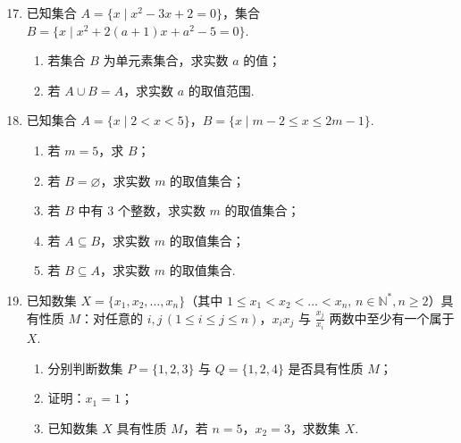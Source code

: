 \documentclass[a4paper,11pt]{article}
\begin{document}
\begin{enumerate}
\setcounter{enumi}{16}

\item 已知集合 $A=\{x\mid x^2-3x+2=0\}$，集合 $B=\{x\mid x^2+2(a+1)x+a^2-5=0\}$.
\begin{enumerate}[label=(\arabic*)]
\item 若集合 $B$ 为单元素集合，求实数 $a$ 的值；
\item 若 $A\cup B=A$，求实数 $a$ 的取值范围.
\end{enumerate}

\ans{（1）$a=-3$；（2）$(-\infty,-3]$}

\ifanswer
\solbegin
{}
\step{综上所述，$a$ 的取值范围为 $(-\infty,-3]$.}
\solend

\fi
\ansspace[6]
\item 已知集合 $A=\{x\mid 2<x<5\}$，$B=\{x\mid m-2\leqslant x\leqslant 2m-1\}$.
\begin{enumerate}[label=(\arabic*)]
\item 若 $m=5$，求 $B$；
\item 若 $B=\varnothing$，求实数 $m$ 的取值集合；
\item 若 $B$ 中有 3 个整数，求实数 $m$ 的取值集合；
\item 若 $A\subseteq B$，求实数 $m$ 的取值集合；
\item 若 $B\subseteq A$，求实数 $m$ 的取值集合.
\end{enumerate}


\ansspace[12]
\item 已知数集 $X=\{x_1,x_2,\dots,x_n\}$（其中 $1\leqslant x_1<x_2<\dots<x_n,\,n\in\mathbb{N}^*,n\geqslant 2$）具有性质 $M$：对任意的 $i,j\,(1\leqslant i\leqslant j\leqslant n)$，$x_ix_j$ 与 $\tfrac{x_j}{x_i}$ 两数中至少有一个属于 $X$.
\begin{enumerate}[label=(\arabic*)]
\item 分别判断数集 $P=\{1,2,3\}$ 与 $Q=\{1,2,4\}$ 是否具有性质 $M$；
\item 证明：$x_1=1$；
\item 已知数集 $X$ 具有性质 $M$，若 $n=5$，$x_2=3$，求数集 $X$.
\end{enumerate}


\end{enumerate}
\end{document}
